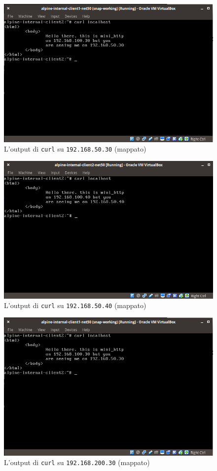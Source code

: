 \begin{figure}
  \includegraphics[scale=0.4]{img/alpine-internal-client1-net50}
  \caption[Output di curl su target 1 in \texttt{net50}]
  {L'output di \texttt{curl} su \texttt{192.168.50.30} (mappato)}
  \label{fig:alpine-internal-client1-net50}
\end{figure}
\begin{figure}
  \includegraphics[scale=0.4]{img/alpine-internal-client2-net50}
  \caption[Output di curl su target 2 in \texttt{net50}]
  {L'output di \texttt{curl} su \texttt{192.168.50.40} (mappato)}
  \label{fig:alpine-internal-client2-net50}
\end{figure}
\begin{figure}
  \includegraphics[scale=0.4]{img/alpine-internal-client1-net50}
  \caption[Output di curl su target 3 in \texttt{net200}]
  {L'output di \texttt{curl} su \texttt{192.168.200.30} (mappato)}
  \label{fig:alpine-internal-client-net200}
\end{figure}
